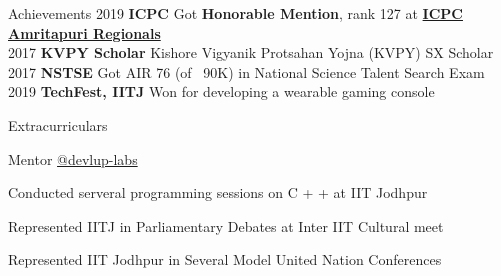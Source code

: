 \documentclass[]{deedy-resume-openfont}
\begin{document}
\begin{minipage}[t]{0.66\textwidth}



\begin{section}{Achievements}
2019 \textbf{ICPC} Got \textbf{Honorable Mention}, rank 127 at \href{https://icpc.global/ICPCID/SV747893JYP7}{\textbf{ICPC Amritapuri Regionals \small{\faExternalLink}}} \\\normalsize
2017 \textbf{KVPY Scholar} Kishore Vigyanik Protsahan Yojna (KVPY) SX Scholar\\
2017 \textbf{NSTSE} Got AIR 76 (of ~90K) in National Science Talent Search Exam\\
2019 \textbf{TechFest, IITJ} Won for developing a wearable gaming console\\

\end{section}

\begin{section}{Extracurriculars}

\begin{tightemize}
\vspace{\topsep} %
\item Mentor \href{https://github.com/devlup-labs}{@devlup-labs \faExternalLink} \\
\item Conducted serveral programming sessions on C + + at IIT Jodhpur \\
\item Represented IITJ in Parliamentary Debates at Inter IIT Cultural meet \\
\item Represented IIT Jodhpur in Several Model United Nation Conferences \\
\end{tightemize}
\end{section}

\sectionsep



\end{minipage} 
\end{document}
